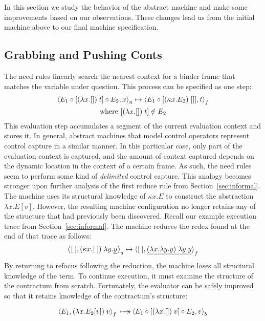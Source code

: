 \documentclass{LMCS}
\theoremstyle{plain}
\theoremstyle{remark}
\newcommand{\mapsTo}[0]{\mbox{\ensuremath{\makebox[0pt][l]{\hspace{7pt}$\rightarrow$}\longmapsto}}}
\renewcommand{\comp}[0]{\ensuremath{\circ}}
\newcommand{\refocus}[1]{\Braket{#1}_f}
\newcommand{\rebuild}[1]{\Braket{#1}_b}
\newcommand{\reduce}[1]{\Braket{#1}_d}
\newcommand{\need}[1]{\Braket{#1}_n}
\begin{document}
In this section we study the behavior of the abstract machine and
make some improvements based on our observations.  These changes lead us
from the initial machine above to our final machine specification.

\subsection{Grabbing and Pushing Conts}
\label{sec:conts}
The need rules linearly search the nearest context for a binder
frame that matches the variable under question.  This process can be specified
as one step:
\begin{gather*}
  \need{E_1 \comp [(\lambda x.[])\; t] \comp E_2, x}  \mapsto
\refocus{E_1 \comp [(\kappa x.E_2)\; []], t} \\
\text{where } \lbrack(\lambda x.[])\; t] \notin E_2
\end{gather*}
This evaluation step accumulates a segment of the current evaluation context
and stores it.  In general, abstract machines that model control operators
represent control capture in a similar manner.  In this particular case, only
part of the evaluation context is captured, and the amount of context captured
depends on the dynamic location in the context of a certain frame.  As such,
the need rules seem to perform some kind of \emph{delimited} control
capture. This analogy becomes stronger upon further analysis of the first
reduce rule from Section~\ref{sec:informal}.
The machine uses its structural knowledge of $\kappa x.E$ to construct the
abstraction $\lambda x.E[v]$.  However, the resulting machine configuration no
longer retains any of the structure that had previously been discovered.
Recall our example execution trace from Section~\ref{sec:informal}. 
The machine reduces the redex found at the end of that trace as follows:
\begin{gather*}
  \reduce{[\;], (\kappa x.[\;])\;\lambda y.\underline{y}} \mapsto
  \braket{[\;],\underline{(\lambda x.\lambda y.y)\;\lambda
      y.y}}_f
\end{gather*}
By returning to refocus following the reduction, the machine loses all
structural knowledge of the term.  To continue execution, it must
examine the structure of the contractum from scratch.
Fortunately, the evaluator can be safely improved so that it retains 
knowledge of the contractum's structure:
\begin{prop}
  \begin{equation*}
     \refocus{E_1, (\lambda x.E_2[v])\;v}  \mapsTo 
     \rebuild{E_1 \comp [(\lambda x.[])\;v] \comp E_2, v} 
  \end{equation*}
\end{prop}
\end{document}
